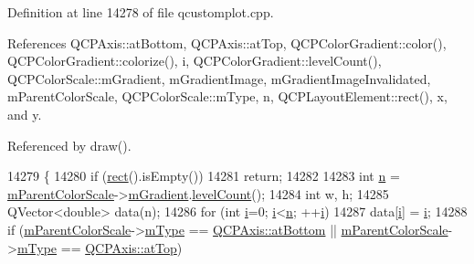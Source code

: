 Definition at line 14278 of file qcustomplot.\+cpp.



References Q\+C\+P\+Axis\+::at\+Bottom, Q\+C\+P\+Axis\+::at\+Top, Q\+C\+P\+Color\+Gradient\+::color(), Q\+C\+P\+Color\+Gradient\+::colorize(), i, Q\+C\+P\+Color\+Gradient\+::level\+Count(), Q\+C\+P\+Color\+Scale\+::m\+Gradient, m\+Gradient\+Image, m\+Gradient\+Image\+Invalidated, m\+Parent\+Color\+Scale, Q\+C\+P\+Color\+Scale\+::m\+Type, n, Q\+C\+P\+Layout\+Element\+::rect(), x, and y.



Referenced by draw().


\begin{DoxyCode}
14279 \{
14280   \textcolor{keywordflow}{if} (\hyperlink{class_q_c_p_layout_element_affdfea003469aac3d0fac5f4e06171bc}{rect}().isEmpty())
14281     \textcolor{keywordflow}{return};
14282   
14283   \textcolor{keywordtype}{int} \hyperlink{_comparision_pictures_2_createtest_image_8m_aeab71244afb687f16d8c4f5ee9d6ef0e}{n} = \hyperlink{class_q_c_p_color_scale_axis_rect_private_a311c73f51a4cb0b556388197833cf099}{mParentColorScale}->\hyperlink{class_q_c_p_color_scale_ae195a385032066b5c46cc3301af58922}{mGradient}.\hyperlink{class_q_c_p_color_gradient_ae7537a8e6d0fed3f1928328062bb0f4e}{levelCount}();
14284   \textcolor{keywordtype}{int} w, h;
14285   QVector<double> data(n);
14286   \textcolor{keywordflow}{for} (\textcolor{keywordtype}{int} \hyperlink{_comparision_pictures_2_createtest_image_8m_a6f6ccfcf58b31cb6412107d9d5281426}{i}=0; \hyperlink{_comparision_pictures_2_createtest_image_8m_a6f6ccfcf58b31cb6412107d9d5281426}{i}<\hyperlink{_comparision_pictures_2_createtest_image_8m_aeab71244afb687f16d8c4f5ee9d6ef0e}{n}; ++\hyperlink{_comparision_pictures_2_createtest_image_8m_a6f6ccfcf58b31cb6412107d9d5281426}{i})
14287     data[\hyperlink{_comparision_pictures_2_createtest_image_8m_a6f6ccfcf58b31cb6412107d9d5281426}{i}] = \hyperlink{_comparision_pictures_2_createtest_image_8m_a6f6ccfcf58b31cb6412107d9d5281426}{i};
14288   \textcolor{keywordflow}{if} (\hyperlink{class_q_c_p_color_scale_axis_rect_private_a311c73f51a4cb0b556388197833cf099}{mParentColorScale}->\hyperlink{class_q_c_p_color_scale_a7d47ed4ab76f38e50164e9d77fe33789}{mType} == \hyperlink{class_q_c_p_axis_ae2bcc1728b382f10f064612b368bc18aa220d68888516b6c3b493d144f1ba438f}{QCPAxis::atBottom} || 
      \hyperlink{class_q_c_p_color_scale_axis_rect_private_a311c73f51a4cb0b556388197833cf099}{mParentColorScale}->\hyperlink{class_q_c_p_color_scale_a7d47ed4ab76f38e50164e9d77fe33789}{mType} == \hyperlink{class_q_c_p_axis_ae2bcc1728b382f10f064612b368bc18aac0ece2b680d3f545e701f75af1655977}{QCPAxis::atTop})

\end{DoxyCode}
